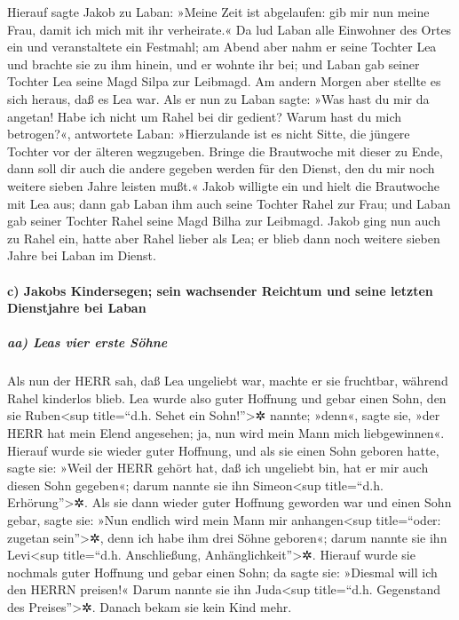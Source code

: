  Hierauf sagte Jakob zu Laban: »Meine Zeit ist
abgelaufen: gib mir nun meine Frau, damit ich mich mit ihr verheirate.«
 Da lud Laban alle Einwohner des Ortes ein und
veranstaltete ein Festmahl;  am Abend aber nahm er seine
Tochter Lea und brachte sie zu ihm hinein, und er wohnte ihr bei;
 und Laban gab seiner Tochter Lea seine Magd Silpa zur
Leibmagd. Am andern Morgen aber stellte es sich heraus, daß es Lea war.
 Als er nun zu Laban sagte: »Was hast du mir da angetan!
Habe ich nicht um Rahel bei dir gedient? Warum hast du mich betrogen?«,
 antwortete Laban: »Hierzulande ist es nicht Sitte, die
jüngere Tochter vor der älteren wegzugeben.  Bringe die
Brautwoche mit dieser zu Ende, dann soll dir auch die andere gegeben
werden für den Dienst, den du mir noch weitere sieben Jahre leisten
mußt.«  Jakob willigte ein und hielt die Brautwoche mit
Lea aus; dann gab Laban ihm auch seine Tochter Rahel zur Frau;
 und Laban gab seiner Tochter Rahel seine Magd Bilha zur
Leibmagd.  Jakob ging nun auch zu Rahel ein, hatte aber
Rahel lieber als Lea; er blieb dann noch weitere sieben Jahre bei Laban
im Dienst.

\hypertarget{c-jakobs-kindersegen-sein-wachsender-reichtum-und-seine-letzten-dienstjahre-bei-laban}{%
\paragraph{c) Jakobs Kindersegen; sein wachsender Reichtum und seine
letzten Dienstjahre bei
Laban}\label{c-jakobs-kindersegen-sein-wachsender-reichtum-und-seine-letzten-dienstjahre-bei-laban}}

\hypertarget{aa-leas-vier-erste-suxf6hne}{%
\subparagraph{aa) Leas vier erste
Söhne}\label{aa-leas-vier-erste-suxf6hne}}

 Als nun der HERR sah, daß Lea ungeliebt war, machte er
sie fruchtbar, während Rahel kinderlos blieb.  Lea wurde
also guter Hoffnung und gebar einen Sohn, den sie Ruben\textless sup
title=``d.h. Sehet ein Sohn!''\textgreater✲ nannte; »denn«, sagte sie,
»der HERR hat mein Elend angesehen; ja, nun wird mein Mann mich
liebgewinnen«.  Hierauf wurde sie wieder guter Hoffnung,
und als sie einen Sohn geboren hatte, sagte sie: »Weil der HERR gehört
hat, daß ich ungeliebt bin, hat er mir auch diesen Sohn gegeben«; darum
nannte sie ihn Simeon\textless sup title=``d.h. Erhörung''\textgreater✲.
 Als sie dann wieder guter Hoffnung geworden war und
einen Sohn gebar, sagte sie: »Nun endlich wird mein Mann mir
anhangen\textless sup title=``oder: zugetan sein''\textgreater✲, denn
ich habe ihm drei Söhne geboren«; darum nannte sie ihn Levi\textless sup
title=``d.h. Anschließung, Anhänglichkeit''\textgreater✲.
 Hierauf wurde sie nochmals guter Hoffnung und gebar
einen Sohn; da sagte sie: »Diesmal will ich den HERRN preisen!« Darum
nannte sie ihn Juda\textless sup title=``d.h. Gegenstand des
Preises''\textgreater✲. Danach bekam sie kein Kind mehr.

